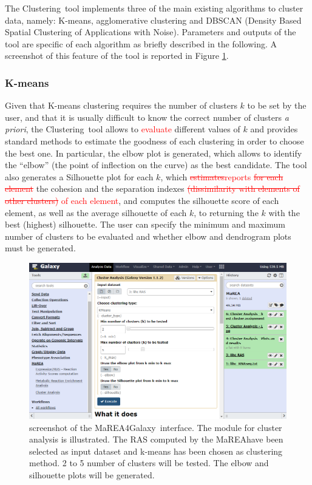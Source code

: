 \documentclass[preprint,12pt,authoryear]{elsarticle}
\newcommand{\red}{\textcolor{red}}
\newcommand{\mareagalaxy}{\textsf{MaREA4Galaxy}}
\newcommand{\mareaTool}{\textsf{MaREA}}
\newcommand{\clusterTool}{\textsf{Clustering}}
\begin{document}
The \clusterTool~tool implements three of the main existing algorithms
to cluster data, namely: K-means, agglomerative clustering and DBSCAN
(Density Based Spatial Clustering of Applications with
Noise). Parameters and outputs of the tool are specific of each
algorithm as briefly described in the following.  A screenshot of this
feature of the tool is reported in Figure \ref{fig:screenshot2}.


\subsubsection{K-means}

Given that K-means clustering requires the number of clusters $k$ to
be set by the user, and that it is usually difficult to know the
correct number of clusters \textit{a priori}, the \clusterTool~tool
allows to \red{evaluate} different values of $k$ and provides standard
methods to estimate the goodness of each clustering in order to choose
the best one. In particular, the elbow plot is generated, which allows
to identify the “elbow” (the point of inflection on the curve) as the
best candidate. The tool also generates a Silhouette plot for each
$k$, which \red{\sout{estimates}reports} \red{\sout{for each element}}
the cohesion and the separation indexes \red{\sout{(dissimilarity with
    elements of other clusters)} of each element}, and computes the
silhouette score of each element, as well as the average silhouette of
each $k$, to returning the $k$ with the best (highest) silhouette.
The user can specify the minimum and maximum number of clusters to be
evaluated and whether elbow and dendrogram plots must be generated.

\begin{figure}[ht]
  \includegraphics[width=1\textwidth]{figs/screenshot2v2q.png}
  \caption{screenshot of the \mareagalaxy\ interface. The module for
    cluster analysis is illustrated. The RAS computed  by the
    \mareaTool have been selected as input dataset and k-means has
    been chosen as clustering method. 2 to 5 number of clusters will
    be tested. The elbow and silhouette plots will be generated.}
  \label{fig:screenshot2}
\end{figure}
\end{document}

